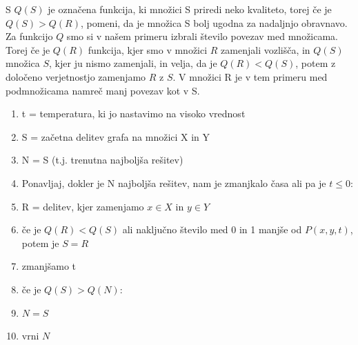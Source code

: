\documentclass[12pt,a4paper]{amsart}
\theoremstyle{definition} %
\theoremstyle{plain} %
\begin{document}
S $Q(S)$ je označena funkcija, ki množici S priredi neko kvaliteto, torej če je $Q(S) >Q(R)$, pomeni, da je množica S bolj ugodna za nadaljnjo obravnavo.
Za funkcijo $Q$ smo si v našem primeru izbrali število povezav med množicama. Torej če je $Q(R)$ funkcija, kjer smo v množici $R$ zamenjali vozlišča, in $Q(S)$ množica $S$, kjer ju nismo zamenjali, in velja, da je $Q(R)<Q(S)$, potem z določeno verjetnostjo zamenjamo $R$ z $S$. V množici R je v tem primeru med podmnožicama namreč manj povezav kot v S. \\
\begin{enumerate}
\item t = temperatura, ki jo nastavimo na visoko vrednost
\item S = začetna delitev grafa na množici X in Y 
\item N = S  (t.j. trenutna najboljša rešitev)
\item Ponavljaj, dokler je N najboljša rešitev, nam je zmanjkalo časa ali pa je $t \leq 0$:
\item \hspace{1cm} R = delitev, kjer zamenjamo $x\in X$ in $y\in Y$
\item \hspace{1cm} če je $Q(R)<Q(S)$ ali naključno število med 0 in 1  manjše od $P(x,y,t)$, potem je $S=R$
\item \hspace{1cm} zmanjšamo t
\item \hspace{1cm} če je $Q(S)>Q(N)$:
\item \hspace{2cm} $N=S$
\item vrni $N$		\\
\end{enumerate}
\end{document}
